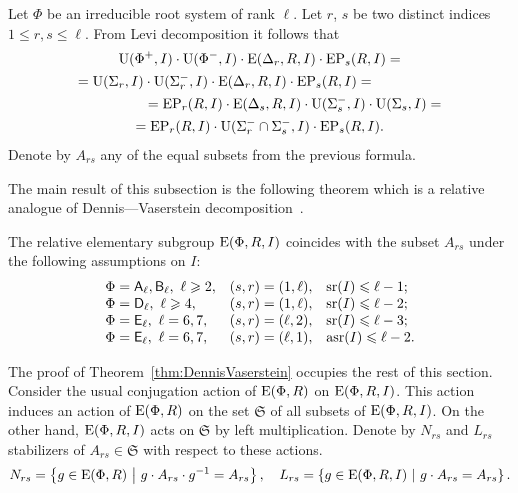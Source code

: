 Let $\Phi$ be an irreducible root system of rank $\ell$.
Let $r$, $s$ be two distinct indices $1\leq r,s \leq \ell$.
From Levi decomposition it follows that
\begin{multline*}
\operatorname{U}(\Phi^+, I)\cdot \operatorname{U}(\Phi^-, I) \cdot \operatorname{E}(\Delta_r, R, I) \cdot \operatorname{EP}_s(R, I) = \\
= \operatorname{U}(\Sigma_r, I)\cdot \operatorname{U}(\Sigma^-_r, I) \cdot \operatorname{E}(\Delta_r, R, I) \cdot \operatorname{EP}_s(R, I) = \hspace{5em} \\
\hspace{5em} = \operatorname{EP}_r(R, I) \cdot \operatorname{E}(\Delta_s, R, I) \cdot \operatorname{U}(\Sigma_s^-, I)\cdot \operatorname{U}(\Sigma_s, I) = \\
= \operatorname{EP}_r(R, I) \cdot \operatorname{U}(\Sigma^-_r\cap \Sigma^-_s, I) \cdot \operatorname{EP}_s(R, I).
\end{multline*}
Denote by $A_{rs}$ any of the equal subsets from the previous formula. 

The main result of this subsection is the following theorem which is a relative analogue of Dennis---Vaserstein decomposition~\cite[Theorem~2.5]{St78}.

\begin{thm}\label{thm:DennisVaserstein}
The relative elementary subgroup $\operatorname{E}(\Phi, R, I)$ coincides with the subset $A_{rs}$ under the following assumptions on $I$:
\[\begin{array}{l@{\quad}l@{\quad}l}
\Phi = \rA_\ell, \rB_\ell,\ \ell\geqslant 2, & (s, r)=(1, \ell), & \sr(I) \leqslant \ell-1; \\     
\Phi = \rD_\ell,\ \ell\geqslant 4,           & (s, r)=(1, \ell), & \sr(I) \leqslant \ell-2; \\ 
\Phi = \rE_\ell,\ \ell=6,7,             & (s, r)=(\ell, 2), & \sr(I) \leqslant \ell-3; \\ 
\Phi = \rE_\ell,\ \ell=6,7,             & (s, r)=(\ell, 1), & \asr(I)\leqslant \ell-2.
\end{array}\]
\end{thm}
The proof of Theorem~\ref{thm:DennisVaserstein} occupies the rest of this section.
Consider the usual conjugation action of $\operatorname{E}(\Phi, R)$ on $\operatorname{E}(\Phi, R, I)$. 
This action induces an action of $\operatorname{E}(\Phi, R)$ on the set $\mathfrak{S}$ of all subsets of $\operatorname{E}(\Phi, R, I)$.
On the other hand, $\operatorname{E}(\Phi, R, I)$ acts on $\mathfrak{S}$ by left multiplication.
Denote by $N_{rs}$ and $L_{rs}$ stabilizers of $A_{rs} \in \mathfrak{S}$ with respect to these actions.
\[ N_{rs} = \left\{ g\in \operatorname{E}(\Phi, R)\ \middle|\ g \cdot A_{rs} \cdot g^{-1} = A_{rs} \right\},\quad L_{rs}= \left\{ g\in \operatorname{E}(\Phi, R, I)\ \middle|\ g \cdot A_{rs} = A_{rs} \right\}. \]

